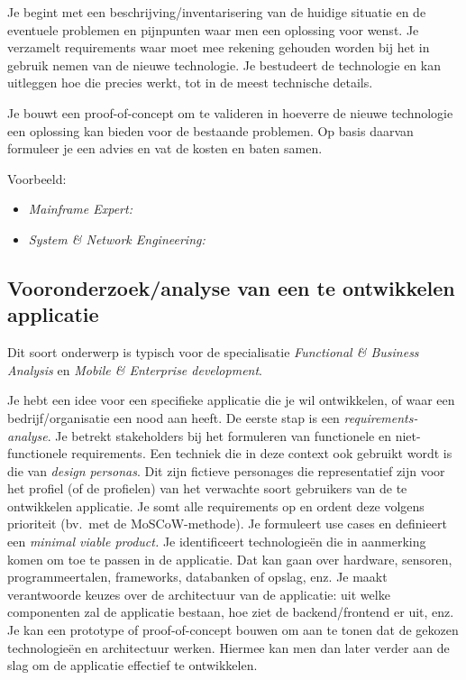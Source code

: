 Je begint met een beschrijving/inventarisering van de huidige situatie en de eventuele problemen en pijnpunten waar men een oplossing voor wenst. Je verzamelt requirements waar moet mee rekening gehouden worden bij het in gebruik nemen van de nieuwe technologie. Je bestudeert de technologie en kan uitleggen hoe die precies werkt, tot in de meest technische details.

Je bouwt een proof-of-concept om te valideren in hoeverre de nieuwe technologie een oplossing kan bieden voor de bestaande problemen. Op basis daarvan formuleer je een advies en vat de kosten en baten samen.

Voorbeeld:

\begin{itemize}
  \item \emph{Mainframe Expert:}  \autocite{Monnoye2024}
  \item \emph{System \& Network Engineering:}  \autocite{Vanduynslager2024}
\end{itemize}

\subsection{Vooronderzoek/analyse van een te ontwikkelen applicatie}%
\label{ssec:onderwerp_types_vooronderzoek_analyse}

Dit soort onderwerp is typisch voor de specialisatie \emph{Functional \& Business Analysis} en \emph{Mobile \& Enterprise development}.


Je hebt een idee voor een specifieke applicatie die je wil ontwikkelen, of waar een bedrijf/organisatie een nood aan heeft. De eerste stap is een \emph{requirements-analyse}. Je betrekt stakeholders bij het formuleren van functionele en niet-functionele requirements. Een techniek die in deze context ook gebruikt wordt is die van \emph{design personas}. Dit zijn fictieve personages die representatief zijn voor het profiel (of de profielen) van het verwachte soort gebruikers van de te ontwikkelen applicatie. Je somt alle requirements op en ordent deze volgens prioriteit (bv.\ met de MoSCoW-methode). Je formuleert use cases en definieert een \emph{minimal viable product.} Je identificeert technologieën die in aanmerking komen om toe te passen in de applicatie. Dat kan gaan over hardware, sensoren, programmeertalen, frameworks, databanken of opslag, enz. Je maakt verantwoorde keuzes over de architectuur van de applicatie: uit welke componenten zal de applicatie bestaan, hoe ziet de backend/frontend er uit, enz. Je kan een prototype of proof-of-concept bouwen om aan te tonen dat de gekozen technologieën en architectuur werken. Hiermee kan men dan later verder aan de slag om de applicatie effectief te ontwikkelen.

